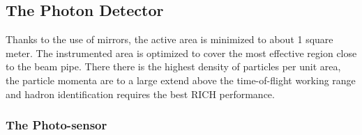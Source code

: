 \documentclass[5p,times,twocolumn]{elsarticle}
\begin{document}
\subsection{The Photon Detector}

Thanks to the use of mirrors, the active area is minimized to about 1 square meter. The instrumented area is optimized to cover the most effective region close to the beam pipe. There there is the highest density of particles per unit area, the particle momenta are to a large extend above the time-of-flight working range and hadron identification requires the best RICH performance.

\subsubsection{The Photo-sensor}
\end{document}
